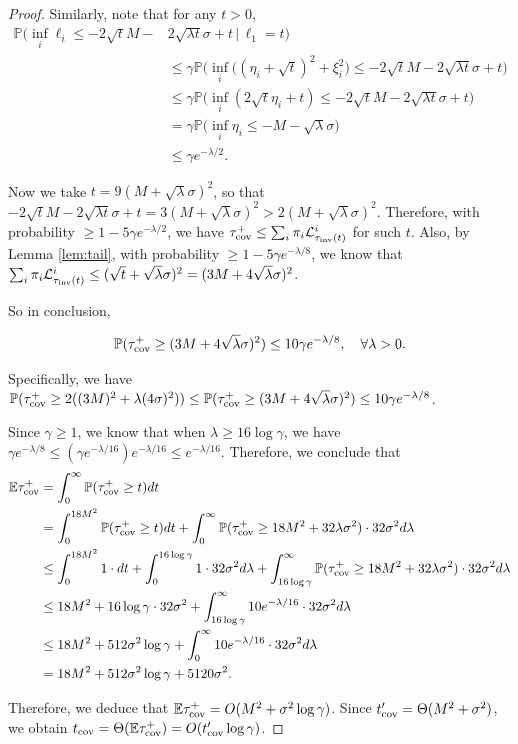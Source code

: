 \documentclass[a4paper, 11pt]{article}
\renewcommand{\P}{\mathbb{P}}
\newcommand{\E}{\mathbb{E}}
\newcommand{\Ell}{\mathcal{L}}
\newcommand{\inv}{\tau_\textnormal{inv}}
\newcommand{\cov}{\textnormal{cov}}
\begin{document}
\begin{proof}
Similarly, note that for any $t>0$,
\begin{equation*}
\begin{aligned}
\P\Big(\inf_i\ell_i\leq -2\sqrt{t}M-& 2\sqrt{\lambda t}\sigma+t\,\Big|\,\ell_1=t\Big)\\
&\leq \gamma\P\Big(\inf_i\big((\eta_i+\sqrt{t})^2+\xi_i^2\big)\leq -2\sqrt{t}M-2\sqrt{\lambda t}\sigma+t\Big)\\
&\leq \gamma\P\Big(\inf_i(2\sqrt{t}\eta_i+t)\leq -2\sqrt{t}M-2\sqrt{\lambda t}\sigma+t\Big)\\
&= \gamma\P\Big(\inf_i\eta_i\leq -M-\sqrt{\lambda}\sigma\Big)\\
&\leq \gamma e^{-\lambda/2}.
\end{aligned}
\end{equation*}

Now we take $t=9(M+\sqrt{\lambda}\sigma)^2$, so that $-2\sqrt{t}M- 2\sqrt{\lambda t}\sigma+t=3(M+\sqrt{\lambda}\sigma)^2> 2(M+\sqrt{\lambda}\sigma)^2$. Therefore, with probability $\geq 1-5\gamma e^{-\lambda/2}$, we have $\tau_\cov^+ \leq \sum_i\pi_i\Ell_{\inv(t)}^i$ for such $t$. Also, by Lemma \ref{lem:tail}, with probability $\geq 1-5\gamma e^{-\lambda/8}$, we know that $\sum_i\pi_i\Ell_{\inv(t)}^i\leq (\sqrt{t}+\sqrt{\lambda}\sigma)^2=(3M+4\sqrt{\lambda}\sigma)^2$.

So in conclusion,

\[\P(\tau_\cov^+\geq (3M+4\sqrt{\lambda}\sigma)^2)\leq 10\gamma e^{-\lambda/8},\quad\forall \lambda>0.\]

Specifically, we have $\P(\tau_\cov^+\geq 2((3M)^2+\lambda (4\sigma)^2))\leq \P(\tau_\cov^+\geq (3M+4\sqrt{\lambda}\sigma)^2)\leq 10\gamma e^{-\lambda/8}$.

Since $\gamma\geq 1$, we know that when $\lambda \geq 16\log \gamma$, we have $\gamma e^{-\lambda/8}\leq (\gamma e^{-\lambda/16}) e^{-\lambda/16}\leq  e^{-\lambda/16}$. Therefore, we conclude that
\begin{equation*}
\begin{aligned}
\E\tau_\cov^+ & = \int_0^\infty \P(\tau_\cov^+\geq t)dt \\
& = \int_0^{18M^2} \P(\tau_\cov^+\geq t)dt + \int_0^\infty \P(\tau_\cov^+\geq 18M^2+32\lambda \sigma^2)\cdot 32\sigma^2 d\lambda\\
& \leq \int_0^{18M^2} 1\cdot dt + \int_0^{16\log\gamma} 1\cdot 32\sigma^2 d\lambda + \int_{16\log\gamma}^\infty \P(\tau_\cov^+\geq 18M^2+32\lambda \sigma^2)\cdot 32\sigma^2 d\lambda\\
& \leq 18M^2 + 16\log\gamma \cdot 32\sigma^2 + \int_{16\log\gamma}^\infty 10e^{-\lambda/16}\cdot 32\sigma^2 d\lambda\\
& \leq 18M^2 + 512\sigma^2\log\gamma + \int_0^\infty 10e^{-\lambda/16}\cdot 32\sigma^2 d\lambda\\
& = 18M^2 + 512\sigma^2\log\gamma+5120\sigma^2.
\end{aligned}
\end{equation*}

Therefore, we deduce that $\E\tau_\cov^+=O(M^2+\sigma^2\log\gamma)$. Since $t_\cov'=\Theta(M^2+\sigma^2)$, we obtain $t_\cov=\Theta(\E\tau_\cov^+)=O(t_\cov'\log\gamma)$.
\end{proof}
\end{document}

